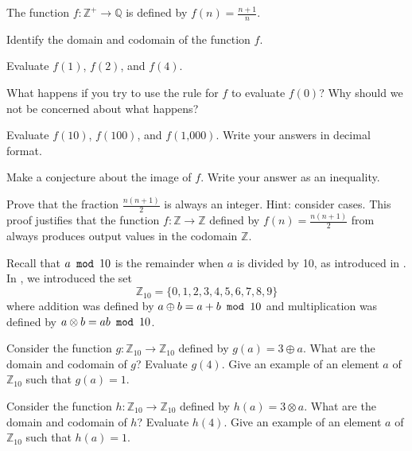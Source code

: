 \begin{exer}[\exerE] %
\label{exer_consecutive_ratios}
    The function $f: \mathbb{Z}^+ \to \mathbb{Q}$ is defined by $f(n) = \frac{n+1}{n}$.
        \begin{exerpart}
            \item Identify the domain and codomain of the function $f$.
            \item Evaluate $f(1)$, $f(2)$, and $f(4)$.
            \item What happens if you try to use the rule for $f$ to evaluate $f(0)$?  Why should we not be concerned about what happens?
            \item Evaluate $f(10)$, $f(100)$, and $f(\text{1,000})$.  Write your answers in decimal format.  
            \item Make a conjecture about the image of $f$.  Write your answer as an inequality.
        \end{exerpart}
\end{exer}

\begin{exer}[\exerE] %
\label{exer_consec_prod_even_fn}
    Prove that the fraction $\frac{n(n+1)}{2}$ is always an integer.  Hint: consider cases.  This proof justifies that the function $f: \mathbb{Z} \to \mathbb{Z}$ defined by $f(n) = \frac{n(n+1)}{2}$ from  always produces output values in the codomain $\mathbb{Z}$.
\end{exer}

\begin{exer}[\exerE] %
\label{exer_functions_on_Zn_vocab}
    Recall that $a \texttt{ mod } 10$ is the remainder when $a$ is divided by 10, as introduced in .  In , we introduced the set $$\mathbb{Z}_{10}= \{0,1,2,3,4,5,6,7,8,9\}$$
    where addition was defined by $a \oplus b = a + b \texttt{ mod } 10$ and multiplication was defined by $a \otimes b = ab \texttt{ mod } 10$.
    \begin{exerpart}
        \item Consider the function $g: \mathbb{Z}_{10} \to \mathbb{Z}_{10}$ defined by $g(a) = 3 \oplus a$.  What are the domain and codomain of $g$?  Evaluate $g(4)$.  Give an example of an element $a$ of $\mathbb{Z}_{10}$ such that $g(a) =1$.
        \item Consider the function $h: \mathbb{Z}_{10} \to \mathbb{Z}_{10}$ defined by $h(a) = 3 \otimes a$.  What are the domain and codomain of $h$?  Evaluate $h(4)$.  Give an example of an element $a$ of $\mathbb{Z}_{10}$ such that $h(a) =1$.
    \end{exerpart}
\end{exer}

